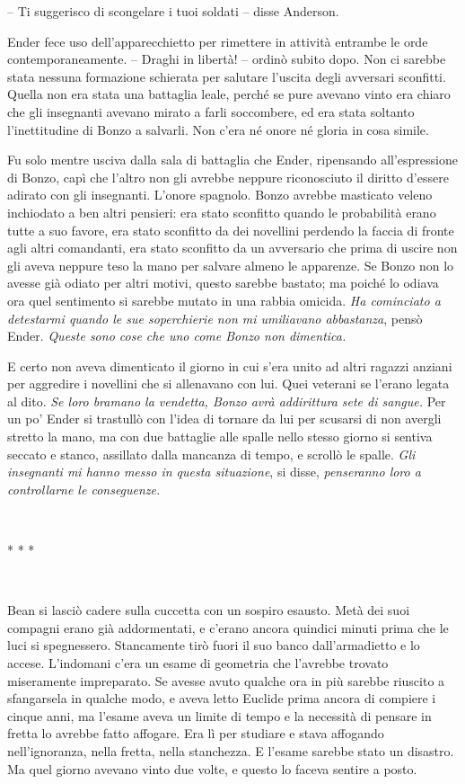 {-- Ti suggerisco di scongelare i tuoi soldati -- disse Anderson.}

{Ender fece uso dell'apparecchietto per rimettere in attività entrambe
	le orde contemporaneamente. -- Draghi in libertà! -- ordinò subito dopo.
	Non ci sarebbe stata nessuna formazione schierata per salutare l'uscita
	degli avversari sconfitti. Quella non era stata una battaglia leale,
	perché se pure avevano vinto era chiaro che gli insegnanti avevano
	mirato a farli soccombere, ed era stata soltanto l'inettitudine di Bonzo
	a salvarli. Non c'era né onore né gloria in cosa simile.}

{Fu solo mentre usciva dalla sala di battaglia che Ender, ripensando
	all'espressione di Bonzo, capì che l'altro non gli avrebbe neppure
	riconosciuto il diritto d'essere adirato con gli insegnanti. L'onore
	spagnolo. Bonzo avrebbe masticato veleno inchiodato a ben altri
	pensieri: era stato sconfitto quando le probabilità erano tutte a suo
	favore, era stato sconfitto da dei novellini perdendo la faccia di
	fronte agli altri comandanti, era stato sconfitto da un avversario che
	prima di uscire non gli aveva neppure teso la mano per salvare almeno le
	apparenze. Se Bonzo non lo avesse già odiato per altri motivi, questo
	sarebbe bastato; ma poiché lo odiava ora quel sentimento si sarebbe
	mutato in una rabbia omicida. \emph{Ha cominciato a detestarmi quando le
		sue soperchierie non mi umiliavano abbastanza}, \emph{} pensò Ender.
	\emph{Queste sono cose che uno come Bonzo non dimentica.}}

{E certo non aveva dimenticato il giorno in cui s'era unito ad altri
	ragazzi anziani per aggredire i novellini che si allenavano con lui.
	Quei veterani se l'erano legata al dito. \emph{Se loro bramano la
		vendetta, Bonzo avrà addirittura sete di sangue.} Per un po' Ender si
	trastullò con l'idea di tornare da lui per scusarsi di non avergli
	stretto la mano, ma con due battaglie alle spalle nello stesso giorno si
	sentiva seccato e stanco, assillato dalla mancanza di tempo, e scrollò
	le spalle. \emph{Gli insegnanti mi hanno messo in questa situazione},
	\emph{} si disse, \emph{penseranno loro a controllarne le conseguenze.}}

{~}

\begin{center}
	{* * *}
\end{center}

{~}

{Bean si lasciò cadere sulla cuccetta con un sospiro esausto. Metà dei
	suoi compagni erano già addormentati, e c'erano ancora quindici minuti
	prima che le luci si spegnessero. Stancamente tirò fuori il suo banco
	dall'armadietto e lo accese. L'indomani c'era un esame di geometria che
	l'avrebbe trovato miseramente impreparato. Se avesse avuto qualche ora
	in più sarebbe riuscito a sfangarsela in qualche modo, e aveva letto
	Euclide prima ancora di compiere i cinque anni, ma l'esame aveva un
	limite di tempo e la necessità di pensare in fretta lo avrebbe fatto
	affogare. Era lì per studiare e stava affogando nell'ignoranza, nella
	fretta, nella stanchezza. E l'esame sarebbe stato un disastro. Ma quel
	giorno avevano vinto due volte, e questo lo faceva sentire a posto.}

